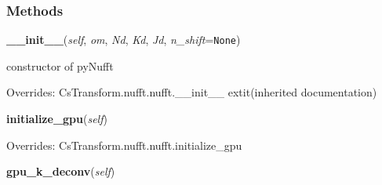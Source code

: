 
  \subsubsection{Methods}

    \vspace{0.5ex}

\hspace{.8\funcindent}\begin{boxedminipage}{\funcwidth}

    \raggedright \textbf{\_\_init\_\_}(\textit{self}, \textit{om}, \textit{Nd}, \textit{Kd}, \textit{Jd}, \textit{n\_shift}={\tt None})

\setlength{\parskip}{2ex}
    constructor of pyNufft

\setlength{\parskip}{1ex}
      Overrides: CsTransform.nufft.nufft.\_\_init\_\_ 	extit{(inherited documentation)}

    \end{boxedminipage}

    \vspace{0.5ex}

\hspace{.8\funcindent}\begin{boxedminipage}{\funcwidth}

    \raggedright \textbf{initialize\_gpu}(\textit{self})

\setlength{\parskip}{2ex}
\setlength{\parskip}{1ex}
      Overrides: CsTransform.nufft.nufft.initialize\_gpu

    \end{boxedminipage}

    \label{CsTransform:pynufft:pynufft:gpu_k_deconv}

    \vspace{0.5ex}

\hspace{.8\funcindent}\begin{boxedminipage}{\funcwidth}

    \raggedright \textbf{gpu\_k\_deconv}(\textit{self})

\setlength{\parskip}{2ex}
\setlength{\parskip}{1ex}
    \end{boxedminipage}

